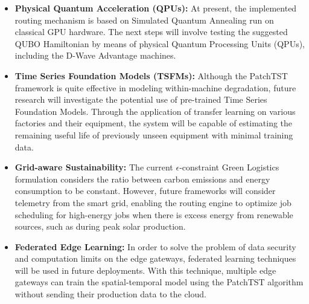 \documentclass[conference]{IEEEtran}
\begin{document}
\begin{itemize}
  \item \textbf{Physical Quantum Acceleration (QPUs):} At present, the implemented routing mechanism is based on Simulated Quantum Annealing run on classical GPU hardware. The next steps will involve testing the suggested QUBO Hamiltonian by means of physical Quantum Processing Units (QPUs), including the D-Wave Advantage machines.

  \item \textbf{Time Series Foundation Models (TSFMs):} Although the PatchTST framework is quite effective in modeling within-machine degradation, future research will investigate the potential use of pre-trained Time Series Foundation Models. Through the application of transfer learning on various factories and their equipment, the system will be capable of estimating the remaining useful life of previously unseen equipment with minimal training data.

  \item \textbf{Grid-aware Sustainability:} The current $\epsilon$-constraint Green Logistics formulation considers the ratio between carbon emissions and energy consumption to be constant. However, future frameworks will consider telemetry from the smart grid, enabling the routing engine to optimize job scheduling for high-energy jobs when there is excess energy from renewable sources, such as during peak solar production.

  \item \textbf{Federated Edge Learning:} In order to solve the problem of data security and computation limits on the edge gateways, federated learning techniques will be used in future deployments. With this technique, multiple edge gateways can train the spatial-temporal model using the PatchTST algorithm without sending their production data to the cloud.
\end{itemize}
\end{document}
